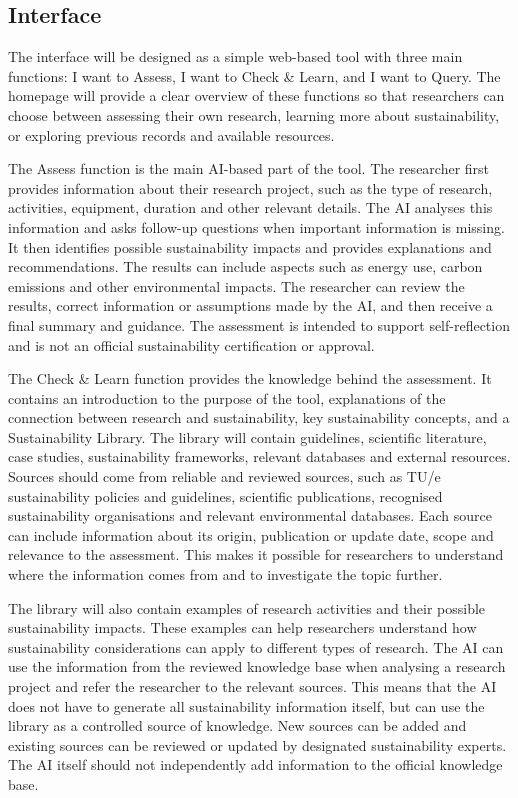 \documentclass[11pt,a4paper]{article}
\begin{document}
\subsection{Interface}
\label{sec:phase2-interface}
The interface will be designed as a simple web-based tool with three main functions: I want to Assess, I want to Check \& Learn, and I want to Query. The homepage will provide a clear overview of these functions so that researchers can choose between assessing their own research, learning more about sustainability, or exploring previous records and available resources.

The Assess function is the main AI-based part of the tool. The researcher first provides information about their research project, such as the type of research, activities, equipment, duration and other relevant details. The AI analyses this information and asks follow-up questions when important information is missing. It then identifies possible sustainability impacts and provides explanations and recommendations. The results can include aspects such as energy use, carbon emissions and other environmental impacts. The researcher can review the results, correct information or assumptions made by the AI, and then receive a final summary and guidance. The assessment is intended to support self-reflection and is not an official sustainability certification or approval.

The Check \& Learn function provides the knowledge behind the assessment. It contains an introduction to the purpose of the tool, explanations of the connection between research and sustainability, key sustainability concepts, and a Sustainability Library. The library will contain guidelines, scientific literature, case studies, sustainability frameworks, relevant databases and external resources. Sources should come from reliable and reviewed sources, such as TU/e sustainability policies and guidelines, scientific publications, recognised sustainability organisations and relevant environmental databases. Each source can include information about its origin, publication or update date, scope and relevance to the assessment. This makes it possible for researchers to understand where the information comes from and to investigate the topic further.

The library will also contain examples of research activities and their possible sustainability impacts. These examples can help researchers understand how sustainability considerations can apply to different types of research. The AI can use the information from the reviewed knowledge base when analysing a research project and refer the researcher to the relevant sources. This means that the AI does not have to generate all sustainability information itself, but can use the library as a controlled source of knowledge. New sources can be added and existing sources can be reviewed or updated by designated sustainability experts. The AI itself should not independently add information to the official knowledge base.
\end{document}
